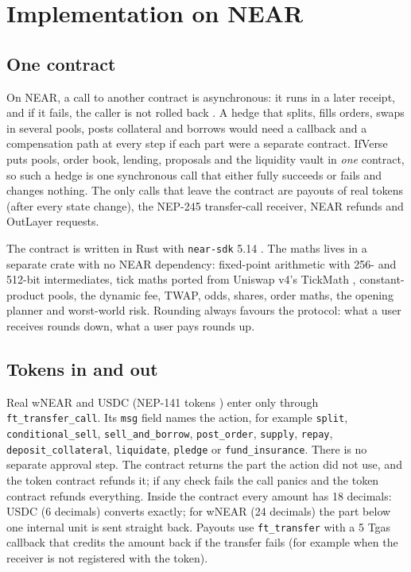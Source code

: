 \documentclass[11pt,a4paper]{article}
\newcommand{\code}[1]{\texttt{\small #1}}
\begin{document}
\section{Implementation on NEAR}
\label{sec:near}

\subsection{One contract}

On NEAR, a call to another contract is asynchronous: it runs in a later receipt, and if it fails, the caller is not
rolled back \cite{neardocs}. A hedge that splits, fills orders, swaps in several pools, posts collateral and borrows
would need a callback and a compensation path at every step if each part were a separate contract. IfVerse puts
pools, order book, lending, proposals and the liquidity vault in \emph{one} contract, so such a hedge is one
synchronous call that either fully succeeds or fails and changes nothing. The only calls that leave the contract are
payouts of real tokens (after every state change), the NEP-245 transfer-call receiver, NEAR refunds and OutLayer
requests.

The contract is written in Rust with \code{near-sdk} 5.14 \cite{nearsdk}. The maths lives in a separate crate with no
NEAR dependency: fixed-point arithmetic with 256- and 512-bit intermediates, tick maths ported from Uniswap v4's
TickMath \cite{uniswapv4}, constant-product pools, the dynamic fee, TWAP, odds, shares, order maths, the opening
planner and worst-world risk. Rounding always favours the protocol: what a user receives rounds down, what a user
pays rounds up.

\subsection{Tokens in and out}

Real wNEAR and USDC (NEP-141 tokens \cite{nep141}) enter only through \code{ft\_transfer\_call}. Its \code{msg} field
names the action, for example \code{split}, \code{conditional\_sell}, \code{sell\_and\_borrow}, \code{post\_order},
\code{supply}, \code{repay}, \code{deposit\_collateral}, \code{liquidate}, \code{pledge} or \code{fund\_insurance}.
There is no separate approval step. The contract returns the part the action did not use, and the token contract
refunds it; if any check fails the call panics and the token contract refunds everything. Inside the contract every
amount has 18 decimals: USDC (6 decimals) converts exactly; for wNEAR (24 decimals) the part below one internal unit
is sent straight back. Payouts use \code{ft\_transfer} with a 5 Tgas callback that credits the amount back if the
transfer fails (for example when the receiver is not registered with the token).
\end{document}
